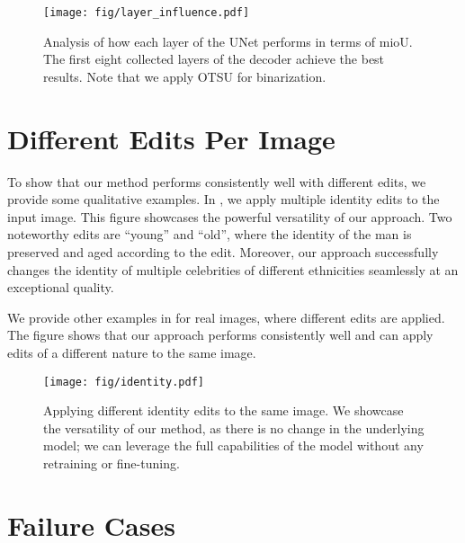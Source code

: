\begin{figure}
    \centering
    \texttt{[image: fig/layer\_influence.pdf]}
    \caption{Analysis of how each layer of the UNet performs in terms of mioU. The first eight collected layers of the decoder achieve the best results. Note that we apply OTSU for binarization.}
    \label{fig:layer}
\end{figure}

\section{Different Edits Per Image}
\label{sec:diff_edit_per_image}
To show that our method performs consistently well with different edits, we provide some qualitative examples.
In , we apply multiple identity edits to the input image.
This figure showcases the powerful versatility of our approach.
Two noteworthy edits are ``young'' and ``old'', where the identity of the man is preserved and aged according to the edit.
Moreover, our approach successfully changes the identity of multiple celebrities of different ethnicities seamlessly at an exceptional quality.

We provide other examples in  for real images, where different edits are applied.
The figure shows that our approach performs consistently well and can apply edits of a different nature to the same image.

\begin{figure*}
    \centering
    \texttt{[image: fig/identity.pdf]}
    \caption{Applying different identity edits to the same image. We showcase the versatility of our method, as there is no change in the underlying model; we can leverage the full capabilities of the model without any retraining or fine-tuning.}
    \label{fig:head_identity}
\end{figure*}



\section{Failure Cases}
\label{sec:failure_cases}

